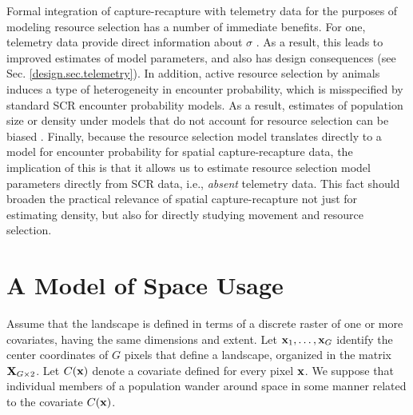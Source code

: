 Formal integration of capture-recapture with telemetry data for the
purposes of modeling resource selection has a number of immediate
benefits. For one, telemetry data provide direct information about
$\sigma$
\citep{sollmann_etal:2012ecol,sollmann_etal:inprepjapplecol}. As a
result, this leads to improved estimates of model parameters, and also
has design consequences (see Sec. \ref{design.sec.telemetry}).  In
addition, active resource selection by animals induces a type of
heterogeneity in encounter probability, which is misspecified by
standard SCR encounter probability models. 
As a result, estimates of
population size or density under models that do not account for
resource selection can be biased \citep{royle_etal:2012mee}.  Finally,
because the resource selection model translates directly to a model
for encounter probability for spatial capture-recapture data, the
implication of this is that it allows us to estimate resource
selection model parameters directly from SCR data, i.e., {\it absent}
telemetry data. This fact should broaden the practical relevance of
spatial capture-recapture not just for estimating density, but also
for directly studying movement and resource selection.








\section{A Model of Space Usage}

\label{rsf.sec.rsfmodel}


Assume that the landscape is defined in terms of a discrete raster of
one or more covariates, having the same dimensions and extent.  Let
${\bf x}_{1},\ldots,{\bf x}_{G}$ identify the center coordinates of
$G$ pixels that define a landscape, organized in the 
 matrix ${\bf X}_{G \times 2}$.  Let $C({\bf x})$ denote a
covariate defined for every pixel ${\bf x}$.  We suppose
that individual members of a population wander around space in some
manner related to the covariate $C({\bf x})$.

